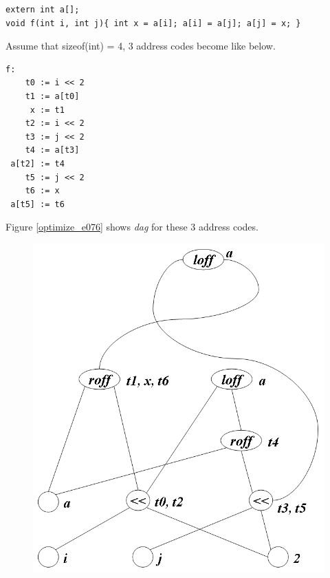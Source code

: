 \begin{Example}
\begin{verbatim}
extern int a[];
void f(int i, int j){ int x = a[i]; a[i] = a[j]; a[j] =	x; }
\end{verbatim}
Assume that sizeof(int) = 4, 3 address codes become like below.
\begin{verbatim}
f:
    t0 := i << 2
    t1 := a[t0]
     x := t1
    t2 := i << 2
    t3 := j << 2
    t4 := a[t3]
 a[t2] := t4
    t5 := j << 2
    t6 := x
 a[t5] := t6
\end{verbatim}
Figure \ref{optimize_e076} shows {\em dag} for these 3 address codes.
\begin{figure}[htbp]
\begin{center}
\begin{htmlonly}
\includegraphics[width=1.0\linewidth,height=1.069\linewidth]{opt031.png}
\end{htmlonly}
\begin{latexonly}

\end{latexonly}
\end{center}
\end{figure}
\end{Example}
